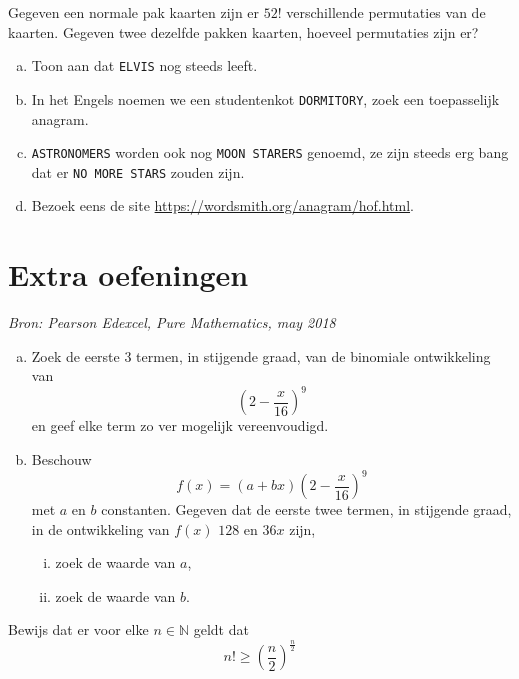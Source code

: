 \documentclass[12pt,a4paper,twoside]{article}
\begin{document}
\begin{oefening} %
Gegeven een normale pak kaarten zijn er $52!$ verschillende permutaties van de kaarten. Gegeven twee dezelfde pakken kaarten, hoeveel permutaties zijn er?
\end{oefening}

\begin{oefening}
  \begin{enumerate}[(a)]
  \item Toon aan dat \texttt{ELVIS} nog steeds leeft.
  \item In het Engels noemen we een studentenkot \texttt{DORMITORY}, zoek een toepasselijk anagram.
  \item \texttt{ASTRONOMERS} worden ook nog \texttt{MOON STARERS} genoemd, ze zijn steeds erg bang dat er \texttt{NO MORE STARS} zouden zijn.
  \item Bezoek eens de site \url{https://wordsmith.org/anagram/hof.html}.
  \end{enumerate}
\end{oefening}

\cleardoublepage
\section{Extra oefeningen}

\begin{oefening}{\em Bron: Pearson Edexcel, Pure Mathematics, may 2018}
  \begin{enumerate}[(a)]
  \item Zoek de eerste 3 termen, in stijgende graad, van de binomiale ontwikkeling van
    $$\left(2-\dfrac{x}{16}\right)^9$$
    en geef elke term zo ver mogelijk vereenvoudigd.
  \item Beschouw
    $$f(x)=(a+bx)\left(2-\dfrac{x}{16}\right)^9$$
    met $a$ en $b$ constanten. Gegeven dat de eerste twee termen, in stijgende graad, in de ontwikkeling van $f(x)$ $128$ en $36x$ zijn,
    \begin{enumerate}[(i)]
    \item zoek de waarde van $a$,
    \item zoek de waarde van $b$.
    \end{enumerate}
  \end{enumerate}
\end{oefening}


\begin{oefening}
  Bewijs dat er voor elke $n \in \mathbb{N}$ geldt dat
  $$ n! \geq \left( \frac{n}{2} \right)^{\frac{n}{2}} $$
\end{oefening}
\end{document}
